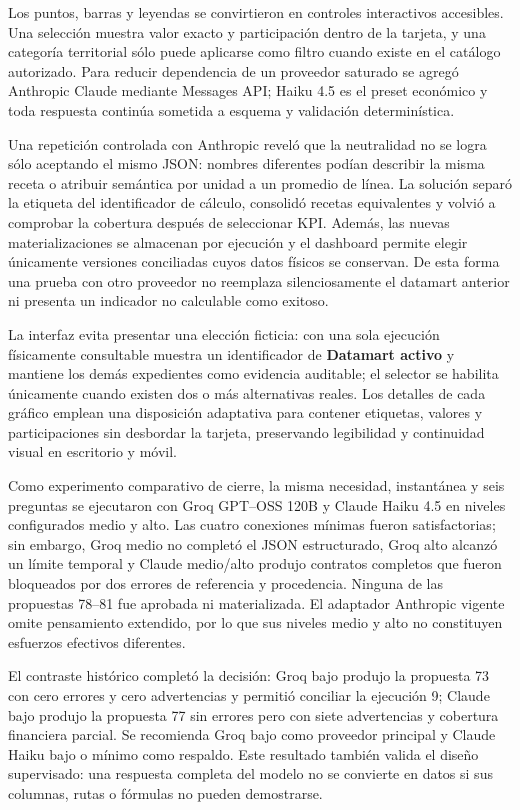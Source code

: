 \documentclass[11pt,letterpaper]{article}
\begin{document}
Los puntos, barras y leyendas se convirtieron en controles interactivos accesibles. Una selección muestra valor exacto y participación dentro de la tarjeta, y una categoría territorial sólo puede aplicarse como filtro cuando existe en el catálogo autorizado. Para reducir dependencia de un proveedor saturado se agregó Anthropic Claude mediante Messages API; Haiku 4.5 es el preset económico y toda respuesta continúa sometida a esquema y validación determinística.

Una repetición controlada con Anthropic reveló que la neutralidad no se logra sólo aceptando el mismo JSON: nombres diferentes podían describir la misma receta o atribuir semántica por unidad a un promedio de línea. La solución separó la etiqueta del identificador de cálculo, consolidó recetas equivalentes y volvió a comprobar la cobertura después de seleccionar KPI. Además, las nuevas materializaciones se almacenan por ejecución y el dashboard permite elegir únicamente versiones conciliadas cuyos datos físicos se conservan. De esta forma una prueba con otro proveedor no reemplaza silenciosamente el datamart anterior ni presenta un indicador no calculable como exitoso.

La interfaz evita presentar una elección ficticia: con una sola ejecución físicamente consultable muestra un identificador de \textbf{Datamart activo} y mantiene los demás expedientes como evidencia auditable; el selector se habilita únicamente cuando existen dos o más alternativas reales. Los detalles de cada gráfico emplean una disposición adaptativa para contener etiquetas, valores y participaciones sin desbordar la tarjeta, preservando legibilidad y continuidad visual en escritorio y móvil.

Como experimento comparativo de cierre, la misma necesidad, instantánea y seis preguntas se ejecutaron con Groq GPT--OSS 120B y Claude Haiku 4.5 en niveles configurados medio y alto. Las cuatro conexiones mínimas fueron satisfactorias; sin embargo, Groq medio no completó el JSON estructurado, Groq alto alcanzó un límite temporal y Claude medio/alto produjo contratos completos que fueron bloqueados por dos errores de referencia y procedencia. Ninguna de las propuestas 78--81 fue aprobada ni materializada. El adaptador Anthropic vigente omite pensamiento extendido, por lo que sus niveles medio y alto no constituyen esfuerzos efectivos diferentes.

El contraste histórico completó la decisión: Groq bajo produjo la propuesta 73 con cero errores y cero advertencias y permitió conciliar la ejecución 9; Claude bajo produjo la propuesta 77 sin errores pero con siete advertencias y cobertura financiera parcial. Se recomienda Groq bajo como proveedor principal y Claude Haiku bajo o mínimo como respaldo. Este resultado también valida el diseño supervisado: una respuesta completa del modelo no se convierte en datos si sus columnas, rutas o fórmulas no pueden demostrarse.
\end{document}
